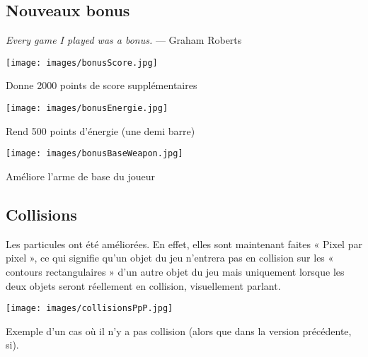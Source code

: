 \documentclass[12pt,a4paper]{article}
\begin{document}
\subsection{Nouveaux bonus}
\par \emph{Every game I played was a bonus.} ---  Graham Roberts
\vspace{0.8cm}
\begin{center}
\par \texttt{[image: images/bonusScore.jpg]} 
\par Donne 2000 points de score supplémentaires
\vspace{0.8cm}
\par \texttt{[image: images/bonusEnergie.jpg]}
\par Rend 500 points d'énergie (une demi barre)
\vspace{0.8cm}
\par \texttt{[image: images/bonusBaseWeapon.jpg]}
\par Améliore l'arme de base du joueur
\end{center}

\subsection{Collisions}
\par Les particules ont été améliorées. En effet, elles sont maintenant faites « Pixel par pixel », ce qui signifie qu'un objet du jeu n'entrera pas en collision sur les « contours rectangulaires » d'un autre objet du jeu mais uniquement lorsque les deux objets seront réellement en collision, visuellement parlant.
\par \texttt{[image: images/collisionsPpP.jpg]}
\par Exemple d'un cas où il n'y a pas collision (alors que dans la version précédente, si).
\end{document}
